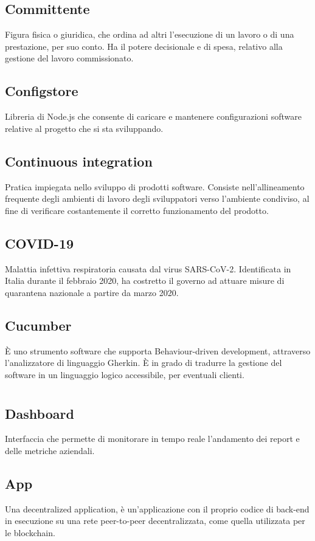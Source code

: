 	\subsection*{Committente}
	Figura fisica o giuridica, che ordina ad altri l’esecuzione di un lavoro o di una prestazione, per suo conto. Ha il potere decisionale e di spesa, relativo alla gestione del lavoro commissionato.
	\subsection*{Configstore}
	Libreria di Node.js che consente di caricare e mantenere configurazioni software relative al progetto che si sta sviluppando.
	\subsection*{Continuous integration}
	Pratica impiegata nello sviluppo di prodotti software. Consiste nell’allineamento frequente degli ambienti di lavoro degli sviluppatori verso l’ambiente condiviso, al fine di verificare costantemente il corretto funzionamento del prodotto.
	\subsection*{COVID-19}
	Malattia infettiva respiratoria causata dal virus SARS-CoV-2. Identificata in Italia durante il febbraio 2020, ha costretto il governo ad attuare misure di quarantena nazionale a partire da marzo 2020.
	\subsection*{Cucumber}
	È uno strumento software che supporta Behaviour-driven development, attraverso l’analizzatore di linguaggio Gherkin. È in grado di tradurre la gestione del software in un linguaggio logico accessibile, per eventuali clienti. 
\pagebreak
\section[D]{}
	\subsection*{Dashboard}
	Interfaccia che permette di monitorare in tempo reale l’andamento dei report e delle metriche aziendali.
	\subsection*{\DJ{}App}
	Una decentralized application, è un’applicazione con il proprio codice di back-end in esecuzione su una rete peer-to-peer decentralizzata, come quella utilizzata per le blockchain.
